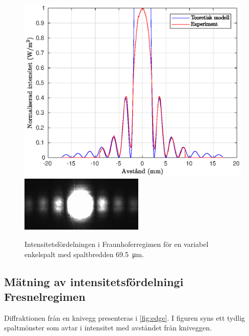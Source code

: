 \documentclass[a4paper]{article}
\begin{document}
\begin{figure}[h!]
	\centering
	\includegraphics[width=0.75\linewidth]{Data/Figurer/variabelEnkelspalt2.eps}
	\includegraphics[width=0.5\linewidth]{Data/Figurer/variabelEnkelspalt2.png}
	\caption{Intensitetsfördelningen i Fraunhoferregimen för en variabel enkelspalt med spaltbredden \SI{69.5}{\micro\m}.}
	\label{fig:variabelEnkelspalt3}
\end{figure}

\FloatBarrier

\subsection{Mätning av intensitetsfördelningi Fresnelregimen}

Diffraktionen från en knivegg presenteras i \autoref{fig:edge}. I figuren syns ett tydlig spaltmönster som avtar i intensitet med avståndet från kniveggen.

\FloatBarrier
\end{document}
